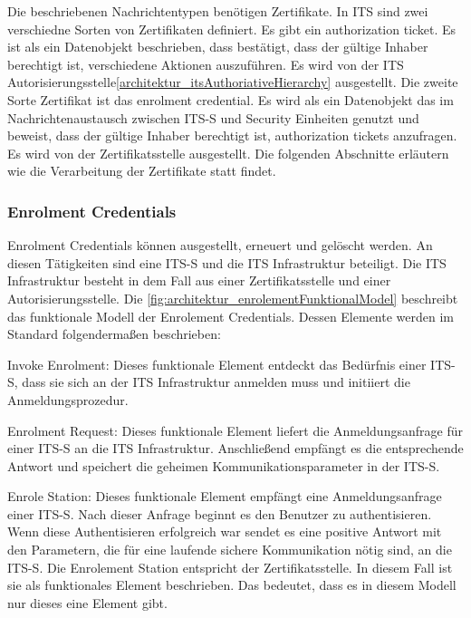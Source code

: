 Die beschriebenen Nachrichtentypen benötigen Zertifikate. In \ac{ITS} sind zwei verschiedne Sorten von Zertifikaten definiert. Es gibt ein \glqq  authorization ticket\grqq. Es ist als ein Datenobjekt beschrieben, dass bestätigt, dass der gültige Inhaber berechtigt ist, verschiedene Aktionen auszuführen. Es wird von der ITS Autorisierungsstelle\ref{architektur_itsAuthoriativeHierarchy} ausgestellt. Die zweite Sorte Zertifikat ist das \glqq enrolment credential\grqq. Es wird als ein Datenobjekt das im Nachrichtenaustausch zwischen \ac{ITS-S} und Security Einheiten genutzt und beweist, dass der gültige Inhaber berechtigt ist, authorization tickets anzufragen. Es wird von der Zertifikatsstelle ausgestellt. Die folgenden Abschnitte erläutern wie die Verarbeitung der Zertifikate statt findet.

\subsubsection{Enrolment Credentials}
Enrolment Credentials können ausgestellt, erneuert und gelöscht werden. An diesen Tätigkeiten sind eine \ac{ITS-S} und die \ac{ITS} Infrastruktur beteiligt. Die \ac{ITS} Infrastruktur besteht in dem Fall aus einer Zertifikatsstelle und einer Autorisierungsstelle. Die \autoref{fig:architektur_enrolementFunktionalModel} beschreibt das funktionale Modell der Enrolement Credentials. Dessen Elemente werden im Standard \cite{ts102731} folgendermaßen beschrieben:



Invoke Enrolment: Dieses funktionale Element entdeckt das Bedürfnis einer \ac{ITS-S}, dass sie sich an der \ac{ITS} Infrastruktur anmelden muss und initiiert die Anmeldungsprozedur.

Enrolment Request: Dieses funktionale Element liefert die Anmeldungsanfrage für einer \ac{ITS-S} an die \ac{ITS} Infrastruktur. Anschließend empfängt es die entsprechende Antwort und speichert die geheimen Kommunikationsparameter in der \ac{ITS-S}.


Enrole Station: Dieses funktionale Element empfängt eine Anmeldungsanfrage einer \ac{ITS-S}. Nach dieser Anfrage beginnt es den Benutzer zu authentisieren. Wenn diese Authentisieren erfolgreich war sendet es eine positive Antwort mit den Parametern, die für eine laufende sichere Kommunikation nötig sind, an die \ac{ITS-S}. Die Enrolement Station entspricht der Zertifikatsstelle. In diesem Fall ist sie als funktionales Element beschrieben. Das bedeutet, dass es in diesem Modell nur dieses eine Element gibt. 

